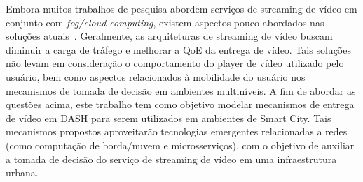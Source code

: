 Embora muitos trabalhos de pesquisa abordem serviços de streaming de vídeo em conjunto com \textit{fog/cloud computing}, existem aspectos pouco abordados nas soluções atuais~\cite{Mouradian2018ComSurv, bentaeb:2018:MSys}. Geralmente, as arquiteturas de streaming de vídeo buscam diminuir a carga de tráfego e melhorar a QoE da entrega de vídeo. Tais soluções não levam em consideração o comportamento do player de vídeo utilizado pelo usuário, bem como aspectos relacionados à mobilidade do usuário nos mecanismos de tomada de decisão em ambientes multiníveis. A fim de abordar as questões acima, este trabalho tem como objetivo modelar mecanismos de entrega de vídeo em DASH para serem utilizados em ambientes de Smart City. Tais mecanismos propostos aproveitarão tecnologias emergentes relacionadas a redes~ (como computação de borda/nuvem e microsserviços), com o objetivo de auxiliar a tomada de decisão do serviço de streaming de vídeo em uma infraestrutura urbana.
